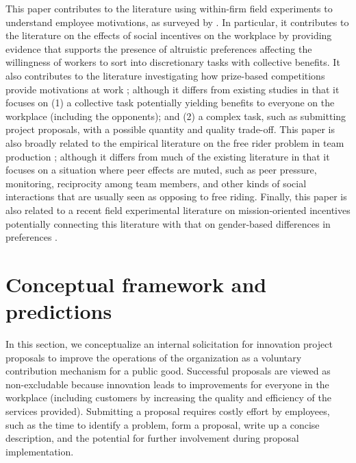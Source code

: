 \documentclass[11pt]{article}
\begin{document}
This paper contributes to the literature using within-firm field
experiments to understand employee motivations, as surveyed by
\citet{bandiera2011field}. In particular, it contributes to the
literature on the effects of social incentives on the workplace
\citetext{\citealp{bandiera2005social}; \citealp[bandiera2008social;][]{bandiera2010social}; \citealp{dellavigna2016estimating}}
by providing evidence that supports the presence of altruistic
preferences affecting the willingness of workers to sort into
discretionary tasks with collective benefits. It also contributes to the
literature investigating how prize-based competitions provide
motivations at work
\citep{knoeber1994testing, ehrenberg1990tournaments, blanes2011tournaments, boudreau2011incentives, barankay2012rank, delfgaauw2013tournament, ashraf2014awards, gibbs2014field, boudreau2016performance};
although it differs from existing studies in that it focuses on (1) a
collective task potentially yielding benefits to everyone on the
workplace (including the opponents); and (2) a complex task, such as
submitting project proposals, with a possible quantity and quality
trade-off. This paper is also broadly related to the empirical
literature on the free rider problem in team production
\citep{erev1993constructive, hamilton2003team, boning2007opportunity, mas2009peers, gibbs2014field};
although it differs from much of the existing literature in that it
focuses on a situation where peer effects are muted, such as peer
pressure, monitoring, reciprocity among team members, and other kinds of
social interactions that are usually seen as opposing to free riding.
Finally, this paper is also related to a recent field experimental
literature on mission-oriented incentives
\citep{carpenter2016motivating} potentially connecting this literature
with that on gender-based differences in preferences
\citep{croson2009gender}.

\section{Conceptual framework and
predictions}\label{conceptual-framework-and-predictions}

In this section, we conceptualize an internal solicitation for
innovation project proposals to improve the operations of the
organization as a voluntary contribution mechanism for a public good.
Successful proposals are viewed as non-excludable because innovation
leads to improvements for everyone in the workplace (including customers
by increasing the quality and efficiency of the services provided).
Submitting a proposal requires costly effort by employees, such as the
time to identify a problem, form a proposal, write up a concise
description, and the potential for further involvement during proposal
implementation.
\end{document}
